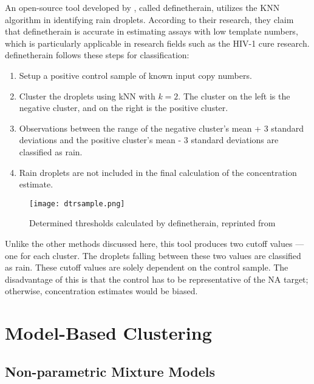 An open-source tool developed by , called definetherain, utilizes the KNN algorithm in identifying rain droplets. According to their research, they claim that definetherain is accurate in estimating assays with low template numbers, which is particularly applicable in research fields such as the HIV-1 cure research. definetherain follows these steps for classification:
\begin{enumerate}
    \item Setup a positive control sample of known input copy numbers. 
    \item Cluster the droplets using kNN with \(k=2\). The cluster on the left is the negative cluster, and on the right is the positive cluster. 
    \item Observations between the range of the negative cluster's mean + 3 standard deviations and the positive cluster's mean - 3 standard deviations are classified as rain.
    \item Rain droplets are not included in the final calculation of the concentration estimate.
\end{enumerate}

\begin{figure}[h]
    \centering
    \texttt{[image: dtrsample.png]}
    \caption[Determined thresholds calculated by definetherain]{Determined thresholds calculated by definetherain, reprinted from \cite{jonesThreshold}}
        \label{fig:dtrsample}
\end{figure}

Unlike the other methods discussed here, this tool produces two cutoff values — one for each cluster. The droplets falling between these two values are classified as rain. These cutoff values are solely dependent on the control sample. The disadvantage of this is that the control has to be representative of the NA target; otherwise, concentration estimates would be biased. 




\section{Model-Based Clustering}
\label{sec:modelbasedclustering}


\subsection{Non-parametric Mixture Models}
\label{sec:nonparametricmixmodels}

